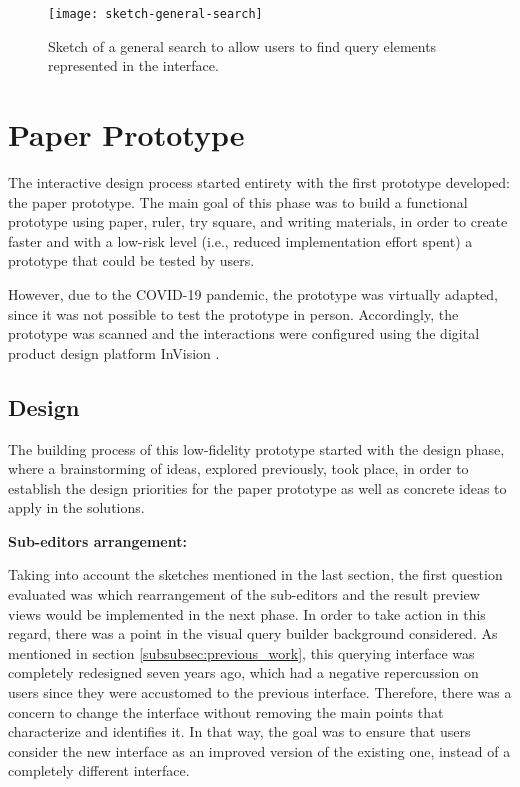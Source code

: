 \begin{figure}[htbp]
	\centering
	\texttt{[image: sketch-general-search]}
	\caption{Sketch of a general search to allow users to find query elements represented in the interface.}
	\label{fig:sketchGeneralSearch}
\end{figure}


\section{Paper Prototype}
\label{sec:paper_prototype}
The interactive design process started entirety with the first prototype developed: the paper prototype. The main goal of this phase was to build a functional prototype using paper, ruler, try square, and writing materials, in order to create faster and with a low-risk level (i.e., reduced implementation effort spent) a prototype that could be tested by users.

However, due to the COVID-19 pandemic, the prototype was virtually adapted, since it was not possible to test the prototype in person. Accordingly, the prototype was scanned and the interactions were configured using the digital product design platform InVision \cite{invision}.

\subsection{Design}
\label{subsec:paper_prototype_design}
The building process of this low-fidelity prototype started with the design phase, where a brainstorming of ideas, explored previously, took place, in order to establish the design priorities for the paper prototype as well as concrete ideas to apply in the solutions.

\medskip

\textbf{Sub-editors arrangement:}

\medskip

Taking into account the sketches mentioned in the last section, the first question evaluated was which rearrangement of the sub-editors and the result preview views would be implemented in the next phase. In order to take action in this regard, there was a point in the visual query builder background considered. As mentioned in section \ref{subsubsec:previous_work}, this querying interface was completely redesigned seven years ago, which had a negative repercussion on users since they were accustomed to the previous interface. Therefore, there was a concern to change the interface without removing the main points that characterize and identifies it. In that way, the goal was to ensure that users consider the new interface as an improved version of the existing one, instead of a completely different interface.

